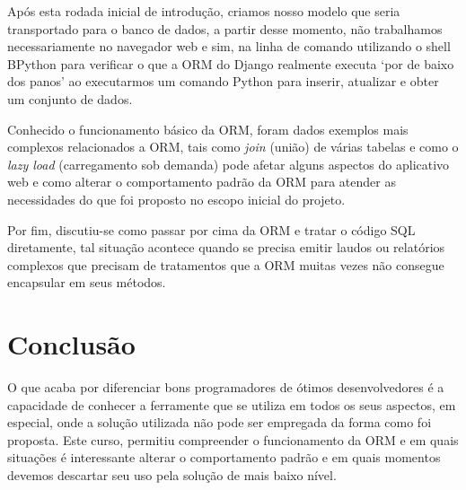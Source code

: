 \documentclass[a4paper]{report}
\begin{document}
        Após esta rodada inicial de introdução, criamos nosso modelo que seria
        transportado para o banco de dados, a partir desse momento, não
        trabalhamos necessariamente no navegador web e sim, na linha de comando
        utilizando o shell BPython para verificar o que a ORM do Django
        realmente executa `por de baixo dos panos' ao executarmos um comando
        Python para inserir, atualizar e obter um conjunto de dados.

        Conhecido o funcionamento básico da ORM, foram dados exemplos mais
        complexos relacionados a ORM, tais como \emph{join} (união) de várias
        tabelas e como o \emph{lazy load} (carregamento sob demanda) pode
        afetar alguns aspectos do aplicativo web e como alterar o comportamento
        padrão da ORM para atender as necessidades do que foi proposto no
        escopo inicial do projeto.

        Por fim, discutiu-se como passar por cima da ORM e tratar o código SQL
        diretamente, tal situação acontece quando se precisa emitir laudos ou
        relatórios complexos que precisam de tratamentos que a ORM muitas vezes
        não consegue encapsular em seus métodos.

        \section{Conclusão}
        O que acaba por diferenciar bons programadores de ótimos desenvolvedores
        é a capacidade de conhecer a ferramente que se utiliza em todos os seus
        aspectos, em especial, onde a solução utilizada não pode ser empregada
        da forma como foi proposta. Este curso, permitiu compreender o
        funcionamento da ORM e em quais situações é interessante alterar o
        comportamento padrão e em quais momentos devemos descartar seu uso pela
        solução de mais baixo nível.
\end{document}

